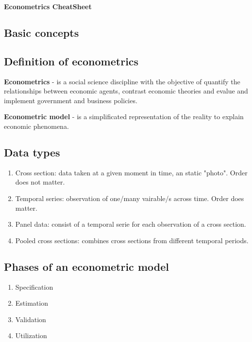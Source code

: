 \documentclass[10pt,landscape]{article}
\begin{document}
\begin{center}
\textbf{\Large Econometrics CheatSheet}
\end{center}
\begin{multicols}{3} %

\section*{Basic concepts}

\subsection*{Definition of econometrics}

\textbf{Econometrics} - is a social science discipline with the objective of quantify the relationships between economic agents, contrast economic theories and evalue and implement government and business policies.

\textbf{Econometric model} - is a simplificated representation of the reality to explain economic phenomena.

\subsection*{Data types}

\begin{enumerate}
\item Cross section: data taken at a given moment in time, an static "photo". Order does not matter.
\item Temporal series: observation of one/many vairable/s across time. Order does matter.
\item Panel data: consist of a temporal serie for each observation of a cross section.
\item Pooled cross sections: combines cross sections from different temporal periods.
\end{enumerate}

\subsection*{Phases of an econometric model}

\begin{enumerate}
\item Specification
\item Estimation
\item Validation
\item Utilization
\end{enumerate}


\end{multicols}
\end{document}
